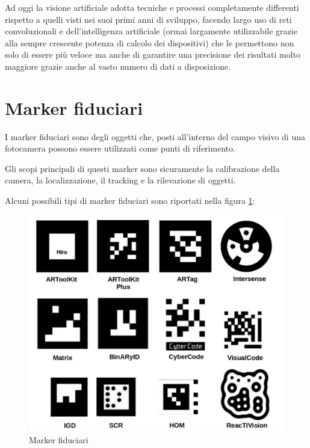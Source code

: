 \documentclass[12pt,a4paper,openright,twoside]{book}
\begin{document}
Ad oggi la visione artificiale adotta tecniche e processi completamente differenti rispetto a quelli visti nei suoi primi anni di sviluppo, facendo largo uso di reti convoluzionali e dell'intelligenza artificiale (ormai largamente utilizzabile grazie alla sempre crescente potenza di calcolo dei dispositivi) che le permettono non solo di essere più veloce ma anche di garantire una precisione dei risultati molto maggiore grazie anche al vasto numero di dati a disposizione.

\section{Marker fiduciari} \label{sec:marker_fiduciari}
I marker fiduciari sono degli oggetti che, posti all'interno del campo visivo di una fotocamera possono essere utilizzati come punti di riferimento. 

Gli scopi principali di questi marker sono sicuramente la calibrazione della camera, la localizzazione, il tracking e la rilevazione di oggetti.

Alcuni possibili tipi di marker fiduciari sono riportati nella figura \ref{fig:marker_fiduciari}:

\begin{figure}[h!]
	\centering
	\includegraphics[width=0.8\linewidth]{./figures/fiducialMarkers.png}
	\caption{Marker fiduciari\cite{GARRIDOJURADO20142280}}
	\label{fig:marker_fiduciari}
\end{figure}
\end{document}
